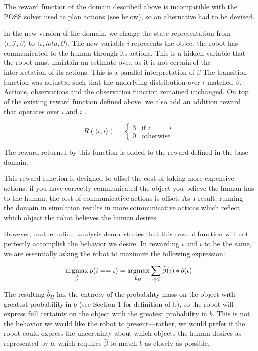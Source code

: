 \documentclass{article}
\begin{document}
The reward function of the domain described above is incompatible with the POSS solver used to plan actions (see below), so an alternative had to be devised. 

In the new version of the domain, we change the state representation from $\langle \iota, \mathcal{I}, \hat \beta \rangle$ to $\langle \iota, iota, \mathcal{O}\rangle$. The new variable $i$ represents the object the robot has communicated to the human through its actions. This is a hidden variable that the robot must maintain an estimate over, as it is not certain of the interpretation of its actions. This is a parallel interpretation of $\hat \beta$ The transition function was adjusted such that the underlying distribution over $\iota$ matched $\hat \beta$. Actions, observations and the observation function remained unchanged. On top of the existing reward function defined above, we also add an addition reward that operates over $\iota$ and $i$ . 

\begin{equation*}
	R(\langle \iota, i\rangle) = \begin{cases}
		3  & \text{if } \iota == i \\
		0  & \text{otherwise}
	\end{cases}
\end{equation*}

The reward returned by this function is added to the reward defined in the base domain. 

This reward function is designed to offset the cost of taking more expensive actions: if you have correctly communicated the object you believe the human has to the human, the cost of communicative actions is offset. As a result, running the domain in simulation results in more communicative actions which reflect which object the robot believes the human desires. 

However, mathematical analysis demonstrates that this reward function will not perfectly accomplish the behavior we desire. In rewarding $\iota$ and $i$ to be the same, we are essentially asking the robot to maximize the following expression: 


\newcommand{\argmax}{\operatornamewithlimits{argmax}}
\newcommand{\argmin}{\operatornamewithlimits{argmin}}

$$ \argmax_{\hat \beta} p(i == \iota) = \argmax_{\hat b_H} \sum_{\iota \in \mathcal{I}}  \hat \beta(\iota) * b(\iota)$$

The resulting $\hat b_H$ has the entirety of the probability mass on the object with greatest probability in $b$ (see Section 1 for definition of b), so the robot will express full certainty on the object with the greatest probability in $b$. This is not the behavior we would like the robot to present---rather, we would prefer if the robot could express the uncertainty about which objects the human desires as represented by $b$, which requires $\hat \beta$ to match $b$ as closely as possible.
\end{document}
